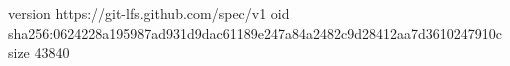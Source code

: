 version https://git-lfs.github.com/spec/v1
oid sha256:0624228a195987ad931d9dac61189e247a84a2482c9d28412aa7d3610247910c
size 43840
